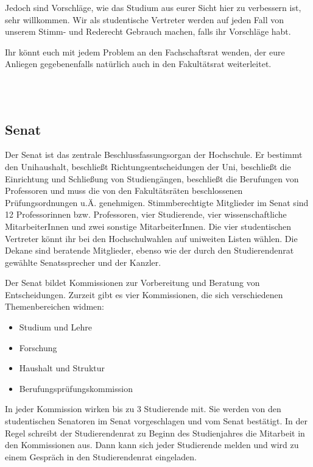 Jedoch sind Vorschläge, wie das Studium aus eurer Sicht hier zu verbessern ist, sehr willkommen.
Wir als studentische Vertreter werden auf jeden Fall von unserem Stimm- und Rederecht Gebrauch machen, falls ihr Vorschläge habt.

Ihr könnt euch mit jedem Problem an den Fachschaftsrat wenden, der eure Anliegen gegebenenfalls natürlich auch in den Fakultätsrat weiterleitet.

\\
\\


\subsection{Senat}
\label{senat}

Der Senat ist das zentrale Beschlussfassungsorgan der Hochschule.
Er bestimmt den Unihaushalt, beschließt Richtungsentscheidungen der Uni, beschließt die Einrichtung und Schließung von Studiengängen, beschließt die Berufungen von Professoren und muss die von den Fakultätsräten beschlossenen Prüfungsordnungen u.Ä. genehmigen.
Stimmberechtigte Mitglieder im Senat sind 12 Professorinnen bzw. Professoren, vier Studierende, vier wissenschaftliche MitarbeiterInnen und zwei sonstige MitarbeiterInnen.
Die vier studentischen Vertreter könnt ihr bei den Hochschulwahlen auf uniweiten Listen wählen.
Die Dekane sind beratende Mitglieder, ebenso wie der durch den Studierendenrat gewählte Senatssprecher und der Kanzler.

Der Senat bildet Kommissionen zur Vorbereitung und Beratung von Entscheidungen.
Zurzeit gibt es vier Kommissionen, die sich verschiedenen Themenbereichen widmen:

\begin{itemize}
    \item Studium und Lehre
    \item Forschung
    \item Haushalt und Struktur
    \item Berufungsprüfungskommission
\end{itemize}

In jeder Kommission wirken bis zu 3 Studierende mit.
Sie werden von den studentischen Senatoren im Senat vorgeschlagen und vom Senat bestätigt.
In der Regel schreibt der Studierendenrat zu Beginn des Studienjahres die Mitarbeit in den Kommissionen aus.
Dann kann sich jeder Studierende melden und wird zu einem Gespräch in den Studierendenrat eingeladen.


